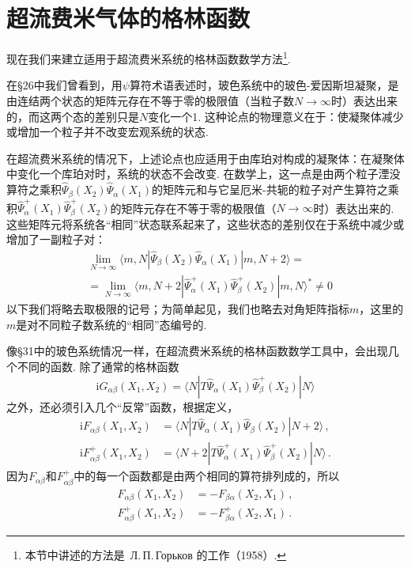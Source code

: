 \section{超流费米气体的格林函数}

现在我们来建立适用于超流费米系统的格林函数数学方法\footnote{本节中讲述的方法是~Л.\,П.\,Горьков 的工作（1958）.}.

在§26中我们曾看到，用$\psi$算符术语表述时，玻色系统中的玻色-爱因斯坦凝聚，是由连结两个状态的矩阵元存在不等于零的极限值（当粒子数$N\to\infty$时）表达出来的，而这两个态的差别只是$N$变化一个1. 这种论点的物理意义在于：使凝聚体减少或增加一个粒子并不改变宏观系统的状态.

在超流费米系统的情况下，上述论点也应适用于由库珀对构成的凝聚体：在凝聚体中变化一个库珀对时，系统的状态不会改变. 在数学上，这一点是由两个粒子湮没算符之乘积$\hat\Psi_\beta(X_2)\hat\Psi_\alpha(X_1)$的矩阵元和与它呈厄米-共轭的粒子对产生算符之乘积$\hat\Psi^{+}_\alpha(X_1)\hat\Psi^{+}_\beta(X_2)$的矩阵元存在不等于零的极限值（$N\to\infty$时）表达出来的. 这些矩阵元将系统各“相同”状态联系起来了，这些状态的差别仅在于系统中减少或增加了一副粒子对：
\begin{equation}
\begin{aligned}
&\lim_{N\to\infty}\langle m,N|\hat\Psi_\beta(X_2)\hat\Psi_\alpha(X_1)|m,N+2\rangle = {}\\
&= \lim_{N\to\infty}\langle m,N+2|\hat\Psi^{+}_\alpha(X_1)\hat\Psi^{+}_\beta(X_2)|m,N\rangle^* \neq 0
\end{aligned}
\label{41.1}
\end{equation}
以下我们将略去取极限的记号；为简单起见，我们也略去对角矩阵指标$m$，这里的$m$是对不同粒子数系统的“相同”态编号的.

像§31中的玻色系统情况一样，在超流费米系统的格林函数数学工具中，会出现几个不同的函数. 除了通常的格林函数
\begin{equation}
\mathrm iG_{\alpha\beta}(X_1,X_2) = \langle N|T\hat\Psi_\alpha(X_1)\hat\Psi^{+}_\beta(X_2)|N\rangle
\label{41.2}
\end{equation}
之外，还必须引入几个“反常”函数，根据定义，
\begin{equation}
\begin{aligned}
\mathrm iF_{\alpha\beta}(X_1,X_2) &= \langle N|T\hat\Psi_\alpha(X_1)\hat\Psi_\beta(X_2)|N+2\rangle\,,\\
\mathrm iF^{+}_{\alpha\beta}(X_1,X_2) &= \langle N+2|T\hat\Psi^{+}_\alpha(X_1)\hat\Psi^{+}_\beta(X_2)|N\rangle\,.
\end{aligned}
\label{41.3}
\end{equation}
因为$F_{\alpha\beta}$和$F^{+}_{\alpha\beta}$中的每一个函数都是由两个相同的算符排列成的，所以
\begin{equation}
\begin{aligned}
F_{\alpha\beta}(X_1,X_2) &= -F_{\beta\alpha}(X_2,X_1)\,,\\
F^{+}_{\alpha\beta}(X_1,X_2) &= -F^{+}_{\beta\alpha}(X_2,X_1)\,.
\end{aligned}
\label{41.4}
\end{equation}

